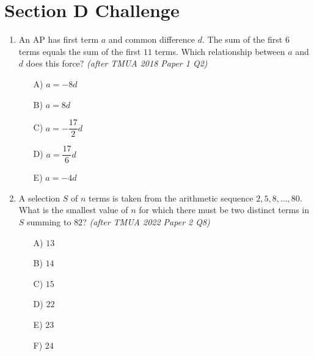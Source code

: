 \documentclass[11pt,a4paper]{article}
\begin{document}
\section*{Section D \quad Challenge}
\begin{enumerate}

\item An AP has first term $a$ and common difference $d$. The sum of the first $6$ terms equals the sum of the first $11$ terms. Which relationship between $a$ and $d$ does this force? \textit{\small(after TMUA 2018 Paper 1 Q2)}
\begin{itemize}
\item[A)] $a=-8d$
\item[B)] $a=8d$
\item[C)] $a=-\dfrac{17}{2}d$
\item[D)] $a=\dfrac{17}{6}d$
\item[E)] $a=-4d$
\end{itemize}


\item A selection $S$ of $n$ terms is taken from the arithmetic sequence $2,5,8,\ldots,80$. What is the smallest value of $n$ for which there must be two distinct terms in $S$ summing to $82$? \textit{\small(after TMUA 2022 Paper 2 Q8)}
\begin{itemize}
\item[A)] $13$
\item[B)] $14$
\item[C)] $15$
\item[D)] $22$
\item[E)] $23$
\item[F)] $24$
\end{itemize}


\end{enumerate}
\end{document}
